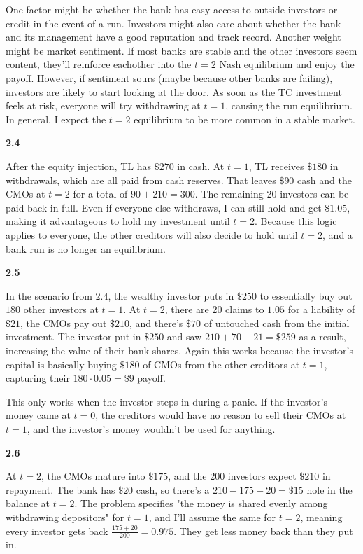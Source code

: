 \documentclass[11pt]{article}
\begin{document}
One factor might be whether the bank has easy access to outside investors or credit in the event of a run. Investors might also care about whether the bank and its management have a good reputation and track record. Another weight might be market sentiment. If most banks are stable and the other investors seem content, they'll reinforce eachother into the $t = 2$ Nash equilibrium and enjoy the payoff. However, if sentiment sours (maybe because other banks are failing), investors are likely to start looking at the door. As soon as the TC investment feels at risk, everyone will try withdrawing at $t = 1$, causing the run equilibrium. In general, I expect the $t = 2$ equilibrium to be more common in a stable market.

\textbf{2.4}

After the equity injection, TL has $\$270$ in cash. At $t = 1$, TL receives $\$180$ in withdrawals, which are all paid from cash reserves. That leaves $\$90$ cash and the CMOs at $t = 2$ for a total of $90 + 210 = 300$. The remaining 20 investors can be paid back in full. Even if everyone else withdraws, I can still hold and get $\$1.05$, making it advantageous to hold my investment until $t = 2$. Because this logic applies to everyone, the other creditors will also decide to hold until $t = 2$, and a bank run is no longer an equilibrium.

\textbf{2.5}

In the scenario from $2.4$, the wealthy investor puts in $\$250$ to essentially buy out $180$ other investors at $t = 1$. At $t = 2$, there are 20 claims to $1.05$ for a liability of $\$21$, the CMOs pay out $\$210$, and there's $\$70$ of untouched cash from the initial investment. The investor put in $\$250$ and saw $210 + 70 - 21 = \$259$ as a result, increasing the value of their bank shares. Again this works because the investor's capital is basically buying $\$180$ of CMOs from the other creditors at $t = 1$, capturing their $180 \cdot 0.05 = \$9$ payoff.  

This only works when the investor steps in during a panic. If the investor's money came at $t = 0$, the creditors would have no reason to sell their CMOs at $t = 1$, and the investor's money wouldn't be used for anything.

\textbf{2.6}

At $t = 2$, the CMOs mature into $\$175$, and the 200 investors expect $\$210$ in repayment. The bank has $\$20$ cash, so there's a $210 - 175 - 20 = \$15$ hole in the balance at $t = 2$. The problem specifies "the money is shared evenly among withdrawing depositors" for $t = 1$, and I'll assume the same for $t = 2$, meaning every investor gets back $\frac{175 + 20}{200} = 0.975$. They get less money back than they put in.
\end{document}
